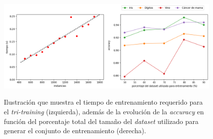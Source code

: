 \begin{figure}[h]
	\caption[\textit{Tri-training}: resultados (tiempo-porcentaje)]{Ilustración que muestra el tiempo de entrenamiento requerido para el \textit{tri-training} (izquierda), además de la evolución de la \textit{accuracy} en función del porcentaje total del tamaño del \textit{dataset} utilizado para generar el conjunto de entrenamiento (derecha).}
	\centering
	\includegraphics[width=\textwidth]{../img/memoria/5_tritraining_time-percentage}
	\label{gr:tt_time-percentage}
\end{figure}

